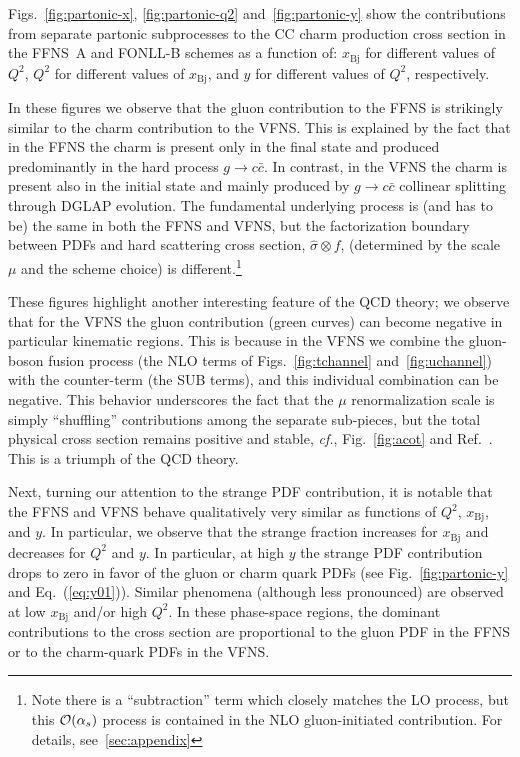 \documentclass[pdftex,twocolumn,epjc3]{svjour3}          %
\newcommand{\xbj}{\ensuremath{x_{\text{Bj}}}\xspace}
\newcommand{\fonll} {{FONLL-B}\xspace}
\newcommand{\ffns} {{FFNS~A}\xspace}
\begin{document}
Figs.~\ref{fig:partonic-x}, \ref{fig:partonic-q2}
and~\ref{fig:partonic-y} show the contributions from separate partonic
subprocesses to the CC charm production cross section in the \ffns and
\fonll schemes as a function of: \xbj for different values of $Q^2$,
$Q^2$ for different values of \xbj, and $y$ for different values of
$Q^2$, respectively.

%
In these figures we observe that the gluon contribution to the FFNS is
strikingly similar to the charm contribution to the VFNS.
%
This is explained by the fact that in the FFNS the charm is present
only in the final state and produced predominantly in the hard process
$g \to c\bar{c}$. In contrast, in the VFNS the charm is present also
in the initial state and mainly produced by $g\to c\bar{c}$ collinear
splitting through DGLAP evolution.
%
The fundamental underlying process is (and has to be) the same in both
the FFNS and VFNS, but the factorization boundary between PDFs and
hard scattering cross section, $\hat{\sigma}\otimes f$, (determined by
the scale $\mu$ and the scheme choice) is different.\footnote{Note
  there is a ``subtraction'' term which closely matches the LO
  process, but this ${\cal O}(\alpha_s)$ process is contained in the
  NLO gluon-initiated contribution.  For details,
  see~\ref{sec:appendix} }


These figures highlight another interesting feature of the QCD theory;
we observe that for the VFNS the gluon contribution (green curves) can
become negative in particular kinematic regions.
This is because in the VFNS we combine the gluon-boson fusion process
(the NLO terms of Figs.~\ref{fig:tchannel} and~\ref{fig:uchannel})
with the counter-term  (the SUB terms),
and this individual combination can be negative.
%
This behavior underscores the fact that the $\mu$ renormalization scale
is simply ``shuffling'' contributions among the separate sub-pieces,
but the total physical cross section remains positive and stable,
{\it cf.}, Fig.~\ref{fig:acot} and Ref.~\cite{Aivazis:1993pi}.
This is a triumph of the QCD theory. 



Next, turning our attention to the strange PDF contribution, it is
notable that the FFNS and VFNS behave qualitatively very similar as
functions of $Q^2$, \xbj, and $y$. In particular, we observe that the
strange fraction increases for \xbj and decreases for $Q^2$ and $y$.
%
In particular, at high $y$ the strange PDF contribution drops to zero
in favor of the gluon or charm quark PDFs (see
Fig.~\ref{fig:partonic-y} and Eq.~(\ref{eq:y01})). Similar phenomena
(although less pronounced) are observed at low \xbj and/or high
$Q^2$. In these phase-space regions, the dominant contributions to the
cross section are proportional to the gluon PDF in the FFNS or to the
charm-quark PDFs in the VFNS.
\end{document}
